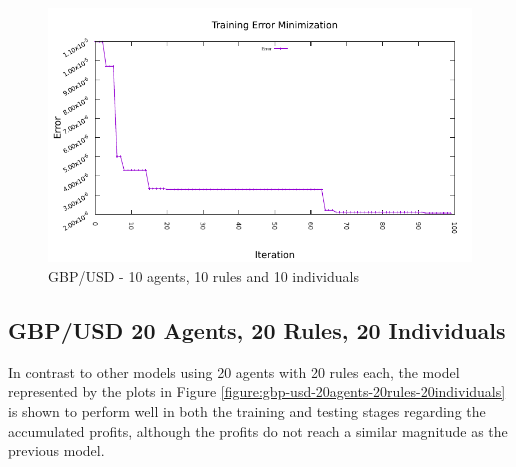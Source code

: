 \begin{figure}[htp]
  \medskip

  \includegraphics[width=.45\textwidth]{img/plots/gbp_usd_h1-10agents-10rules-10ind-100gen_error_minimization.pdf}

  \caption{GBP/USD - 10 agents, 10 rules and 10 individuals}
  \label{figure:gbp-usd-10agents-10rules-10individuals}
\end{figure}

\newpage

\subsection{GBP/USD 20 Agents, 20 Rules, 20 Individuals}
\label{results:forecast-gbp-usd-20agents-20rules-20individuals}

In contrast to other models using 20 agents with 20 rules each, the model represented by the plots in Figure \ref{figure:gbp-usd-20agents-20rules-20individuals} is shown to perform well in both the training and testing stages regarding the accumulated profits, although the profits do not reach a similar magnitude as the previous model.

